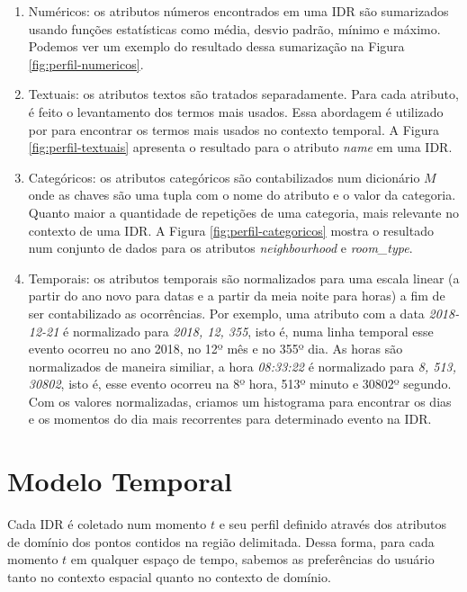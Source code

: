 \begin{enumerate}
	\item Numéricos: os atributos números encontrados em uma IDR são sumarizados usando funções estatísticas como média, desvio padrão, mínimo e máximo. Podemos ver um exemplo do resultado dessa sumarização na Figura \ref{fig:perfil-numericos}.

	\item Textuais: os atributos textos são tratados separadamente. Para cada atributo, é feito o levantamento dos termos mais usados. Essa abordagem é utilizado por  para encontrar os termos mais usados no contexto temporal. A Figura \ref{fig:perfil-textuais} apresenta o resultado para o atributo {\em name} em uma IDR.

	\item Categóricos: os atributos categóricos são contabilizados num dicionário $M$ onde as chaves são uma tupla com o nome do atributo e o valor da categoria. Quanto maior a quantidade de repetições de uma categoria, mais relevante no contexto de uma IDR. A Figura \ref{fig:perfil-categoricos} mostra o resultado num conjunto de dados para os atributos {\em neighbourhood} e {\em room\_type}.

	\item Temporais: os atributos temporais são normalizados para uma escala linear (a partir do ano novo para datas e a partir da meia noite para horas) a fim de ser contabilizado as ocorrências. Por exemplo, uma atributo com a data {\em 2018-12-21} é normalizado para {\em 2018, 12, 355}, isto é, numa linha temporal esse evento ocorreu no ano 2018, no 12º mês e no 355º dia. As horas são normalizados de maneira similiar, a hora {\em 08:33:22} é normalizado para {\em 8, 513, 30802}, isto é, esse evento ocorreu na 8º hora, 513º minuto e 30802º segundo. Com os valores normalizadas, criamos um histograma para encontrar os dias e os momentos do dia mais recorrentes para determinado evento na IDR.
\end{enumerate}


\section{Modelo Temporal}

Cada IDR é coletado num momento $t$ e seu perfil definido através dos atributos de domínio dos pontos contidos na região delimitada. Dessa forma, para cada momento $t$ em qualquer espaço de tempo, sabemos as preferências do usuário tanto no contexto espacial quanto no contexto de domínio.

